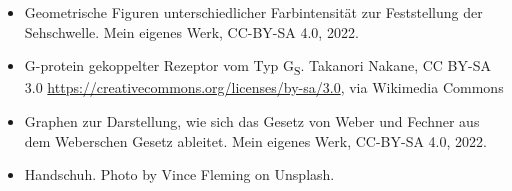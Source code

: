 \documentclass[aspectratio=169]{beamer}
\begin{document}
\begin{frame}
\begin{tiny}
\begin{itemize}
  \item
  Geometrische Figuren unterschiedlicher Farbintensität zur Feststellung der Sehschwelle. Mein eigenes Werk, CC-BY-SA 4.0, 2022.
  
  \item
  G-protein gekoppelter Rezeptor vom Typ G\textsubscript{S}. Takanori Nakane, CC BY-SA 3.0 \url{https://creativecommons.org/licenses/by-sa/3.0}, via Wikimedia Commons
 
 \item
 Graphen zur Darstellung, wie sich das Gesetz von Weber und Fechner aus dem Weberschen Gesetz ableitet. Mein eigenes Werk, CC-BY-SA 4.0, 2022. 
 
\item
Handschuh. Photo by Vince Fleming on Unsplash. 
  \end{itemize}
\end{tiny}
\end{frame}
\end{document}
